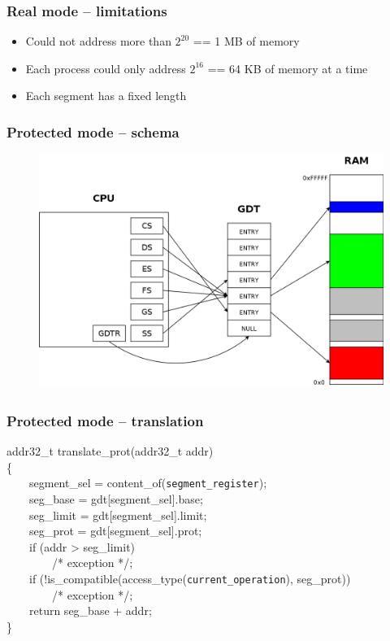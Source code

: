 \documentclass{beamer}
\begin{document}
\begin{frame}
  \frametitle{Real mode -- limitations}

  \begin{itemize}
  \item
    Could not address more than $2^{20}$ == 1 MB of memory
  \item
    Each process could only address $2^{16}$ == 64 KB of memory at a time
  \item
    Each segment has a fixed length
  \end{itemize}
\end{frame}

\begin{frame}
  \frametitle{Protected mode -- schema}

  \begin{figure}
  \includegraphics[scale=0.15]{prot.png}
  \end{figure}
\end{frame}

\begin{frame}
  \frametitle{Protected mode -- translation}

  addr32\_t translate\_prot(addr32\_t addr)\\
 \{\\
  \ \ \ \ segment\_sel = content\_of(\texttt{segment\_register});\\
  \ \ \ \ seg\_base = gdt[segment\_sel].base;\\
  \ \ \ \ seg\_limit = gdt[segment\_sel].limit;\\
  \ \ \ \ seg\_prot = gdt[segment\_sel].prot;\\
  \ \ \ \ if (addr > seg\_limit)\\
  \ \ \ \ \ \ \ \ /* exception */;\\
  \ \ \ \ if (!is\_compatible(access\_type(\texttt{current\_operation}), seg\_prot))\\
  \ \ \ \ \ \ \ \ /* exception */;\\
  \ \ \ \ return seg\_base + addr;\\
 \}
\end{frame}
\end{document}

